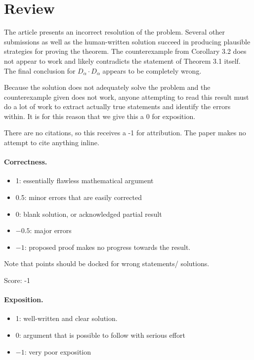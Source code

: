 \documentclass[11pt]{article}
\theoremstyle{definition}
\theoremstyle{remark}
\begin{document}
\maketitle

\section{Review}
The article presents an incorrect resolution of the problem. Several other submissions as well as the human-written solution succeed in producing plausible strategies for proving the theorem. The counterexample from Corollary 3.2 does not appear to work and likely contradicts the statement of Theorem 3.1 itself. The final conclusion for $D_{\alpha}\cdot D_{\alpha}$ appears to be completely wrong.

Because the solution does not adequately solve the problem and the counterexample given does not work, anyone attempting to read this result must do a lot of work to extract actually true statements and identify the errors within. It is for this reason that we give this a 0 for exposition.

There are no citations, so this receives a -1 for attribution. The paper makes no attempt to cite anything inline.

\paragraph{Correctness.}
\begin{itemize}
	\item  1: essentially flawless mathematical argument
	\item  0.5: minor errors that are easily corrected
	\item  0: blank solution, or acknowledged partial result
	\item  $-0.5$: major errors
	\item  $-1$: proposed proof makes no progress towards the result.
\end{itemize}
Note that points should be docked for wrong statements/ solutions.

\noindent Score: -1

\paragraph{Exposition.}
\begin{itemize}
	\item  1: well-written and clear solution.
	\item  0: argument that is possible to follow with serious effort
	\item  $-1$: very poor exposition
\end{itemize}
\end{document}
